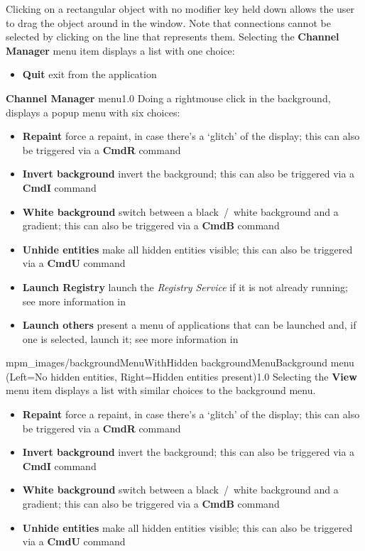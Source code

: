 Clicking on a rectangular object with no modifier key held down allows the user to drag
the object around in the window.
Note that connections cannot be selected by clicking on the line that represents them.
\condPage{}
Selecting the \textbf{Channel Manager} menu item displays a list with one choice:
\begin{itemize}
\item\textbf{Quit} exit from the application
\end{itemize}
%
{\textbf{Channel Manager} menu}{1.0}
\condPage{}
Doing a right\longDash{}mouse click in the background, displays a popup menu with six
choices:
\begin{itemize}
\item\textbf{Repaint} force a repaint, in case there's a `glitch' of the display; this
can also be triggered via a \textbf{Cmd\longDash{}R} command
\item\exSp\textbf{Invert background} invert the background; this can also be triggered via
a \textbf{Cmd\longDash{}I} command
\item\exSp\textbf{White background} switch between a black~/~white background and a
gradient; this can also be triggered via a \textbf{Cmd\longDash{}B} command
\item\exSp\textbf{Unhide entities} make all hidden entities visible; this can also be
triggered via a \textbf{Cmd\longDash{}U} command
\item\exSp\textbf{Launch Registry} launch the \emph{Registry Service} if it is not already
running; see more information in\\
\item\exSp\textbf{Launch others \textellipsis} present a menu of applications that can be
launched and, if one is selected, launch it; see more information in
\end{itemize}
%
{mpm_images/backgroundMenuWithHidden}%
{backgroundMenu}{Background menu (Left=No hidden entities, Right=Hidden
entities present)}{1.0}
\condPage{}
Selecting the \textbf{View} menu item displays a list with similar choices to the
background menu.
\begin{itemize}
\item\textbf{Repaint} force a repaint, in case there's a `glitch' of the display; this
can also be triggered via a \textbf{Cmd\longDash{}R} command
\item\exSp\textbf{Invert background} invert the background; this can also be triggered via
a \textbf{Cmd\longDash{}I} command
\item\exSp\textbf{White background} switch between a black~/~white background and a
gradient; this can also be triggered via a \textbf{Cmd\longDash{}B} command
\item\exSp\textbf{Unhide entities} make all hidden entities visible; this can also be
triggered via a \textbf{Cmd\longDash{}U} command
\end{itemize}
